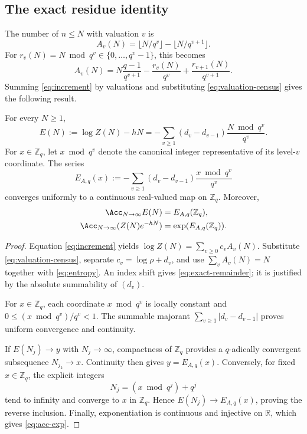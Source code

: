 \subsection{The exact residue identity}

The number of \(n\le N\) with valuation \(v\) is
\[
  A_v(N)=\lfloor N/q^v\rfloor-\lfloor N/q^{v+1}\rfloor .
\]
For \(r_v(N)=N\bmod q^v\in\{0,\ldots,q^v-1\}\), this becomes
\begin{equation}
  A_v(N)=N\frac{q-1}{q^{v+1}}
         -\frac{r_v(N)}{q^v}
         +\frac{r_{v+1}(N)}{q^{v+1}}.
  \label{eq:valuation-census}
\end{equation}
Summing \eqref{eq:increment} by valuations and substituting
\eqref{eq:valuation-census} gives the following result.

\begin{theorem}
\label{thm:qadic-boundary}
For every \(N\ge1\),
\begin{equation}
  E(N):=\log Z(N)-hN
  =-\sum_{v\ge1}(d_v-d_{v-1})\frac{N\bmod q^v}{q^v}.
  \label{eq:exact-remainder}
\end{equation}
For \(x\in\mathbb Z_q\), let \(x\bmod q^v\) denote the canonical integer
representative of its level-\(v\) coordinate.  The series
\begin{equation}
  E_{A,q}(x)
  :=-\sum_{v\ge1}(d_v-d_{v-1})
       \frac{x\bmod q^v}{q^v}
  \label{eq:boundary-map}
\end{equation}
converges uniformly to a continuous real-valued map on \(\mathbb Z_q\).
Moreover,
\begin{align}
  \Acc_{N\to\infty}E(N)&=E_{A,q}(\mathbb Z_q), \label{eq:acc-log}\\
  \Acc_{N\to\infty}(Z(N)e^{-hN})
    &=\exp(E_{A,q}(\mathbb Z_q)). \label{eq:acc-exp}
\end{align}
\end{theorem}

\begin{proof}
Equation \eqref{eq:increment} yields
\(\log Z(N)=\sum_{v\ge0}c_vA_v(N)\).  Substitute
\eqref{eq:valuation-census}, separate \(c_v=\log\rho+d_v\), and use
\(\sum_vA_v(N)=N\) together with \eqref{eq:entropy}.  An index shift gives
\eqref{eq:exact-remainder}; it is justified by the absolute summability of
\((d_v)\).

For \(x\in\mathbb Z_q\), each coordinate \(x\bmod q^v\) is locally constant
and \(0\le(x\bmod q^v)/q^v<1\).  The summable majorant
\(\sum_{v\ge1}|d_v-d_{v-1}|\) proves uniform convergence and continuity.

If \(E(N_j)\to y\) with \(N_j\to\infty\), compactness of \(\mathbb Z_q\)
provides a \(q\)-adically convergent subsequence \(N_{j_k}\to x\).
Continuity then gives \(y=E_{A,q}(x)\).  Conversely, for fixed
\(x\in\mathbb Z_q\), the explicit integers
\[
  N_j=(x\bmod q^j)+q^j
\]
tend to infinity and converge to \(x\) in \(\mathbb Z_q\).  Hence
\(E(N_j)\to E_{A,q}(x)\), proving the reverse inclusion.  Finally,
exponentiation is continuous and injective on \(\mathbb R\), which gives
\eqref{eq:acc-exp}.
\end{proof}


